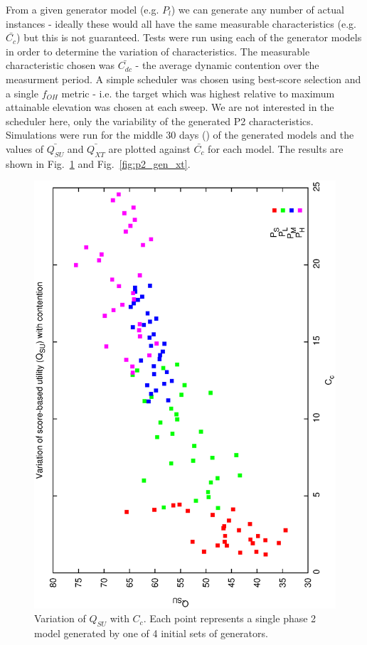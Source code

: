 From a given generator model (e.g. $P_l$) we can generate any number of actual instances - ideally these would all have the same measurable characteristics (e.g. $\bar{C_c}$) but this is not guaranteed. Tests were run using each of the generator models in order to determine the variation of characteristics. The measurable characteristic chosen was $\bar{C_{dc}}$ - the average dynamic contention over the measurment period. A simple scheduler was chosen using best-score selection and a single $f_{OH}$ metric - i.e. the target which was highest relative to maximum attainable elevation was chosen at each sweep. We are not interested in the scheduler here, only the variability of the generated  P2 characteristics. Simulations were run for the middle 30 days () of the generated models and the values of $\bar{Q_{SU}}$ and $\bar{Q_{XT}}$ are plotted against $\bar{C_c}$ for each model. The results are shown in Fig.~\ref{fig:p2_gen_su} and  Fig.~\ref{fig:p2_gen_xt}.



\begin{figure}[h]
\begin{center}
 \includegraphics[scale=0.5, angle=-90]{figures/p2_gen_qsu.eps}
 \caption[Variation of $Q_{SU}$ with $C_C$ for variable phase2 generator models.] 
   {Variation of $Q_{SU}$ with $C_c$. Each point represents a single phase 2 model generated by one of 4 initial sets of generators.}
\label{fig:p2_gen_su}
\end{center}
\end{figure}


